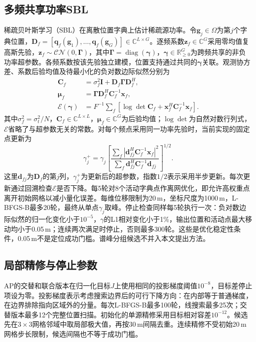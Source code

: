 \documentclass[a4paper,fleqn]{cas-sc}
\numberwithin{equation}{section}
\numberwithin{figure}{section}
\numberwithin{table}{section}
\newcommand{\R}{\mathbb R}
\newcommand{\C}{\mathbb C}
\newcommand{\diag}{\operatorname{diag}}
\begin{document}
\subsection{多频共享功率SBL}
稀疏贝叶斯学习（SBL）在离散位置字典上估计稀疏源功率。令$\bm g_j\in\Omega$为第$j$个字典位置，$\bm D_f=[\bm q_f(\bm g_1),\ldots,\bm q_f(\bm g_G)]\in\C^{L\times G}$。逐频系数$\bm z_f\in\C^G$采用零均值复高斯先验，$\bm z_f\sim\mathcal{CN}(0,\bm\Gamma)$，其中$\bm\Gamma=\diag(\bm\gamma)$，$\bm\gamma\in\R_{\ge0}^G$为跨频共享的非负功率超参数\cite{Nannuru2019}。各频系数按该先验独立建模，位置支持通过共同的$\bm\gamma$关联。观测协方差、系数后验均值及待最小化的负对数边际似然分别为
\begin{align}
 \bm C_f&=\sigma_f^2\bm I+\bm D_f\bm\Gamma\bm D_f^H,\label{eq:sblCov}\\
 \bm\mu_f&=\bm\Gamma\bm D_f^H\bm C_f^{-1}\bm x_f,\nonumber\\
 \mathcal E(\bm\gamma)&=F^{-1}\sum_f[\log\det\bm C_f+\bm x_f^H\bm C_f^{-1}\bm x_f] .\label{eq:sblEvidence}
\end{align}
其中$\sigma_f^2=\sigma_t^2/N$，$\bm C_f\in\C^{L\times L}$，$\bm\mu_f\in\C^G$为后验均值；$\log\det$为自然对数行列式，$\mathcal E$省略了与超参数无关的常数。对每个频点采用同一功率先验时，当前实现的固定点更新为
\begin{equation}
 \gamma_j^+=\gamma_j\left[
 \frac{\sum_f|\bm d_{fj}^H\bm C_f^{-1}\bm x_f|^2}
 {\sum_f\bm d_{fj}^H\bm C_f^{-1}\bm d_{fj}}
 \right]^{1/2} .\label{eq:sblUpdate}
\end{equation}
这里$\bm d_{fj}$为$\bm D_f$的第$j$列，$\gamma_j^+$为更新后的超参数，指数$1/2$表示采用半步更新。每次更新通过回溯检查$\mathcal E$是否下降。每5轮对8个活动字典点作离网优化，即允许高权重点离开初始网格以减小量化误差。每维位移限制为20\,m，坐标尺度为1000\,m，L-BFGS-B最多20轮，最终从单点$\gamma_j$取峰。停止检查同样每5轮执行一次：负对数边际似然的归一化变化小于$10^{-5}$，$\gamma$的L1相对变化小于1\%，输出位置和活动点最大移动均小于0.05\,m；连续两次满足时停止，否则最多300轮。这些是优化稳定性条件，0.05\,m不是定位成功门槛。谱峰分组候选不并入本文提出方法。

\subsection{局部精修与停止参数}
AP的交替和联合版本在归一化目标$J$上使用相同的投影梯度阈值$10^{-8}$，目标差停止项设为零。投影梯度表示考虑搜索边界后的可行下降方向：在内部等于普通梯度，在边界排除指向区域外的分量。每次L-BFGS-B最多100轮，线搜索最多25次；交替版本最多12个完整位置扫描。初始化的单源精修采用目标相对容差$10^{-12}$。候选先在$3\times3$网格邻域中取局部极大值，再按30\,m间隔去重。连续精修不受初始20\,m网格步长限制，候选间隔也不等于成功门槛。
\end{document}
